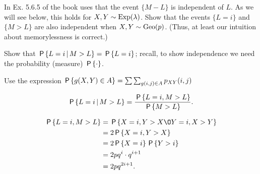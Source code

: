 \documentclass[a4paper,12pt]{article}
\begin{document}
\begin{exercise}\label{ex:10}
In Ex.
5.6.5 of the book uses that the event $\{M-L\}$ is independent of $L$.
As we will see below, this holds for $X, Y \sim\Exp{\lambda}$.
Show that the events $\{L=i\}$ and $\{M>L\}$ are also independent when  $X,Y \sim \Geo{p}$.
(Thus, at least our intuition about memorylessness is  correct.)
\begin{hint}
Show that $\P{L=i \given M>L} = \P{L=i}$; recall, to show independence we need the probability (measure) $\P{\cdot}$.

Use the expression $\P{g(X,Y)\in A} = \mathop{\sum\sum}_{g(i, j) \in A} p_{XY}(i,j)$
\end{hint}
\begin{solution}
\begin{align}
    \label{eq:1}
\P{L=i\given M > L} 
=\frac{\P{L=i, M > L}}{\P{M>L}}.
\end{align}

\begin{align}
\P{L=i,  M > L} 
&= \P{X=i, Y > X \O Y=i, X > Y } \\
&= 2\P{X=i,Y > X} \\
&= 2\P{X=i}\P{Y > i} \\
&= 2pq^i\cdot q^{i+1}\\
&= 2p q^{2i+1}.
\end{align}


\end{solution}
\end{exercise}
\end{document}
